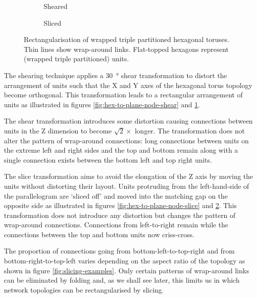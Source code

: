 \begin{figure}
\begin{subfigure}[b]{0.32\linewidth}
					\caption{Sheared}
					\label{fig:hex-to-plane-shear}
				\end{subfigure}
				\begin{subfigure}[b]{0.32\linewidth}
					\center
					
					\caption{Sliced}
					\label{fig:hex-to-plane-slice}
				\end{subfigure}
				
				\caption{Rectangularisation of wrapped triple partitioned hexagonal
				toruses. Thin lines show wrap-around links.  Flat-topped hexagons
				represent (wrapped triple partitioned) units.}
				\label{fig:hex-to-plane}
			\end{figure}
			
			The shearing technique applies a \SI{30}{\degree} shear transformation to
			distort the arrangement of units such that the X and Y axes of the
			hexagonal torus topology become orthogonal. This transformation leads to
			a rectangular arrangement of units as illustrated in figures
			\ref{fig:hex-to-plane-node-shear} and \ref{fig:hex-to-plane-shear}.
			
			The shear transformation introduces some distortion causing connections
			between units in the Z dimension to become $\sqrt{2} \times$ longer. The
			transformation does not alter the pattern of wrap-around connections:
			long connections between units on the extreme left and right sides and
			the top and bottom remain along with a single connection exists between
			the bottom left and top right units.
			
			The slice transformation aims to avoid the elongation of the Z axis by
			moving the units without distorting their layout. Units protruding from
			the left-hand-side of the parallelogram are `sliced off' and moved into
			the matching gap on the opposite side as illustrated in figures
			\ref{fig:hex-to-plane-node-slice} and \ref{fig:hex-to-plane-slice}. This
			transformation does not introduce any distortion but changes the pattern
			of wrap-around connections.  Connections from left-to-right remain while
			the connections between the top and bottom units now criss-cross.
			
			The proportion of connections going from bottom-left-to-top-right and
			from bottom-right-to-top-left varies depending on the aspect ratio of the
			topology as shown in figure \ref{fig:slicing-examples}. Only certain
			patterns of wrap-around links can be eliminated by folding and, as we
			shall see later, this limits us in which network topologies can be
			rectangularised by slicing.
			
